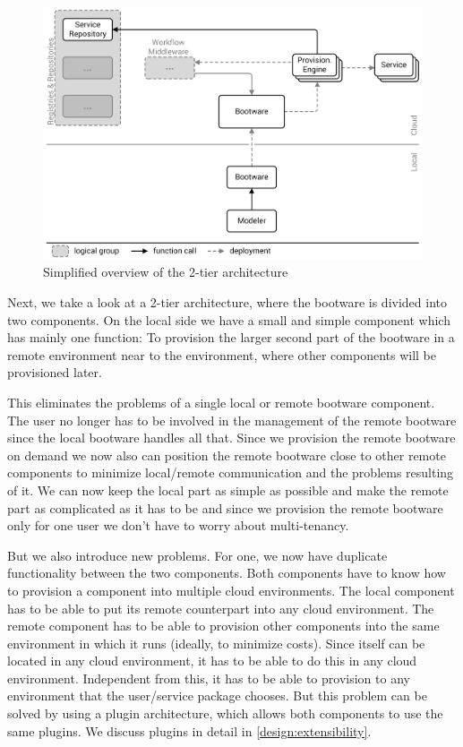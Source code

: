 \begin{figure}[!htbp]
	\centering
	\includegraphics[resolution=600]{design/assets/simple_2_tier}
	\caption{Simplified overview of the 2-tier architecture}
	\label{image:2_tier}
\end{figure}

Next, we take a look at a 2-tier architecture, where the bootware is divided into two components.
On the local side we have a small and simple component which has mainly one function: To provision the larger second part of the bootware in a remote environment near to the environment, where other components will be provisioned later.

This eliminates the problems of a single local or remote bootware component.
The user no longer has to be involved in the management of the remote bootware since the local bootware handles all that.
Since we provision the remote bootware on demand we now also can position the remote bootware close to other remote components to minimize local/remote communication and the problems resulting of it.
We can now keep the local part as simple as possible and make the remote part as complicated as it has to be and since we provision the remote bootware only for one user we don't have to worry about multi-tenancy.

But we also introduce new problems.
For one, we now have duplicate functionality between the two components.
Both components have to know how to provision a component into multiple cloud environments.
The local component has to be able to put its remote counterpart into any cloud environment.
The remote component has to be able to provision other components into the same environment in which it runs (ideally, to minimize costs).
Since itself can be located in any cloud environment, it has to be able to do this in any cloud environment.
Independent from this, it has to be able to provision to any environment that the user/service package chooses.
But this problem can be solved by using a plugin architecture, which allows both components to use the same plugins.
We discuss plugins in detail in \autoref{design:extensibility}.

